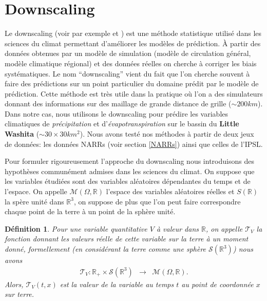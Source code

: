 \documentclass[a4paper,10pt]{article}
\newtheorem{definition}{Définition}
\begin{document}
\section{Downscaling}
\label{dwnsc}
Le downscaling (voir par exemple \cite{vrac2012dynamical} et \cite{ayar2016intercomparison}) est une méthode statistique utilisé dans les sciences du climat permettant d'améliorer les modèles de prédiction. À partir des données obtenues par un modèle de simulation (modèle de circulation général, modèle climatique régional) et des données réelles on cherche à corriger les biais systématiques. Le nom ``downscaling'' vient du fait que l'on cherche souvent à faire des prédictions sur un point particulier du domaine prédit par le modèle de prédiction. Cette méthode est très utile dans la pratique où l'on a des simulateurs donnant des informations sur des maillage de grande distance de grille ($\sim 200km$). Dans notre cas, nous utilisons le downscaling pour prédire les variables climatiques de \textit{précipitation} et d'\textit{évapotranspiration} sur le bassin du \textbf{Little Washita} ($\sim 30\times30 km^2$). Nous avons testé nos méthodes à partir de deux jeux de données: les données NARRs (voir section \ref{NARRs}) ainsi que celles de l'IPSL.

Pour formuler rigoureusement l'approche du downscaling nous introduisons des hypothèses communément admises dans les sciences du climat. On suppose que les variables étudiées sont des variables aléatoires dépendantes du temps et de l'espace. On appelle $\mathcal{M}(\Omega,\mathbb{R})$ l'espace des variables aléatoires réelles et $S(\mathbb{R})$ la spère unité dans $\mathbb{R}^3$, on suppose de plus que l'on peut faire correspondre chaque point de la terre à un point de la sphère unité.

\begin{definition}
	\label{terre}
	Pour une variable quantitative $V$ à valeur dans $\mathbb{R}$, on appelle $\mathcal{T}_V$ la fonction donnant les  valeurs réelle de cette variable sur la terre à un moment donné, formellement (en considérant la terre comme une sphère $\mathcal{S}(\mathbb{R}^3)$) nous avons
	\begin{equation}
		\begin{array}{ccc}
			\mathcal{T}_V: \mathbb{R}_{+}\times\mathcal{S}(\mathbb{R}^{3}) & \to & \mathcal{M}(\Omega,\mathbb{R}).
		\end{array}
	\end{equation}
	Alors, $\mathcal{T}_V(t,x)$ est la valeur de la variable au temps $t$ au point de coordonnée $x$ sur terre.	
\end{definition}
\end{document}
